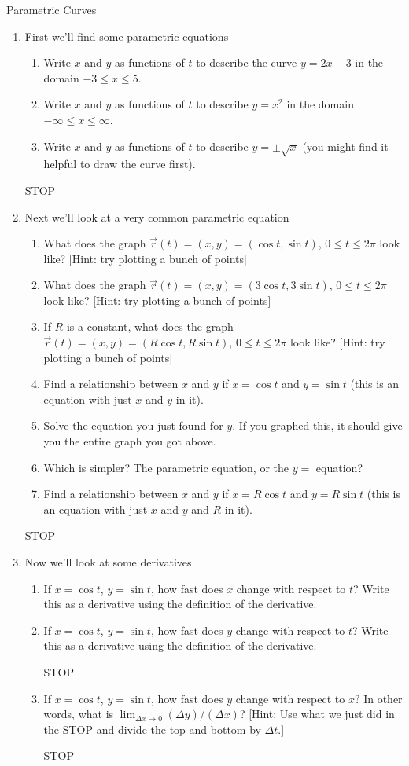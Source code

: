 \documentclass[11pt]{article}
\newcommand{\sstop}{\smallskip\begin{center}STOP\end{center}\smallskip}
\begin{document}
\begin{center}Parametric Curves\end{center}

\begin{enumerate}
\item First we'll find some parametric equations
\begin{enumerate}
\item Write $x$ and $y$ as functions of $t$ to describe the curve $y=2x-3$ in the domain $-3\leq x \leq 5$.
\item Write $x$ and $y$ as functions of $t$ to describe $y=x^2$ in the domain $-\infty\leq x\leq \infty$.
\item Write $x$ and $y$ as functions of $t$ to describe $y=\pm \sqrt{x}$ (you might find it helpful to draw the curve first).
\end{enumerate}

\sstop

\item Next we'll look at a very common parametric equation
\begin{enumerate}
\item What does the graph $\vec r(t)=(x,y)=(\cos t, \sin t)$, $0\leq t\leq 2\pi$ look like?  [Hint: try plotting a bunch of points]
\item What does the graph $\vec r(t)=(x,y)=(3\cos t, 3\sin t)$, $0\leq t\leq 2\pi$ look like?  [Hint: try plotting a bunch of points]
\item If $R$ is a constant, what does the graph $\vec r(t)=(x,y)=(R\cos t, R\sin t)$, $0\leq t\leq 2\pi$ look like?  [Hint: try plotting a bunch of points]
\item Find a relationship between $x$ and $y$ if $x=\cos t$ and $y=\sin t$ (this is an equation with just $x$ and $y$ in it).
\item Solve the equation you just found for $y$.  If you graphed this, it should give you the entire graph you got above.
\item Which is simpler?  The parametric equation, or the $y=$ equation?
\item Find a relationship between $x$ and $y$ if $x=R\cos t$ and $y=R\sin t$ (this is an equation with just $x$ and $y$ and $R$ in it).
\end{enumerate}


\sstop

\item Now we'll look at some derivatives
  \begin{enumerate}
  \item If $x=\cos t$, $y=\sin t$, how fast does $x$ change with respect to $t$?  Write this as a derivative using the definition of the derivative.
  \item If $x=\cos t$, $y=\sin t$, how fast does $y$ change with respect to $t$? Write this as a derivative using the definition of the derivative.
\sstop
  \item If $x=\cos t$, $y=\sin t$, how fast does $y$ change with respect to $x$?  In other words, what is $\lim_{\Delta x\to 0}(\Delta y)/(\Delta x)$?  [Hint: Use what we just did in the STOP and divide the top and bottom by $\Delta t$.]
\sstop


\end{enumerate}
\end{enumerate}
\end{document}
